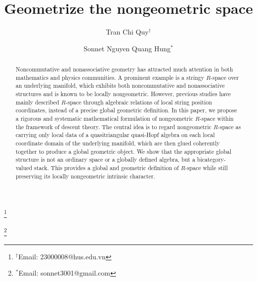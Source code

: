 \documentclass[reqno]{amsart}
\theoremstyle{definition}
\theoremstyle{remark}
\begin{document}
	
	\title[Geometrize the nongeometric space]{Geometrize the nongeometric space}
	
	
	\author{Tran Chi Quy$^\dagger$}
	\thanks{$^\dagger$Email: 23000008@hus.edu.vn}

    \author{Sonnet Nguyen Quang Hung$^*$}
	\thanks{$^*$Email: sonnet3001@gmail.com}

	
	
	
\begin{abstract}
Noncommutative and nonassociative geometry has attracted much attention in both mathematics and physics communities. A prominent example is a stringy $R$-space over an underlying manifold, which exhibits both noncommutative and nonassociative structures and is known to be locally nongeometric. However, previous studies have mainly described $R$-space through algebraic relations of local string position coordinates, instead of a precise global geometric definition. In this paper, we propose a rigorous and systematic mathematical formulation of nongeometric $R$-space within the framework of descent theory. The central idea is to regard nongeometric $R$-space as carrying only local data of a quasitriangular quasi-Hopf algebra on each local coordinate domain of the underlying manifold, which are then glued coherently together to produce a global geometric object. We show that the appropriate global structure is not an ordinary space or a globally defined algebra, but a bicategory-valued stack. This provides a global and geometric definition of $R$-space while still preserving its locally nongeometric intrinsic character.
\end{abstract}

		
	\maketitle
    \tableofcontents
\end{document}
